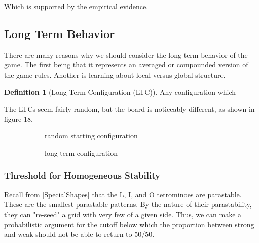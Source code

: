 \documentclass[12pt]{article}
\theoremstyle{definition}
\newtheorem{definition}{Definition}%
\theoremstyle{remark}
\theoremstyle{remark}
\begin{document}
Which is supported by the empirical evidence. %

\subsection{Long Term Behavior}
\label{LongTermB}
\par
There are many reasons why we should consider the long-term behavior of the game. The first being that it represents an averaged or compounded version of the game rules. Another is learning about local versus global structure.

\begin{definition}[Long-Term Configuration (LTC)]
Any configuration which 
\end{definition}


\par
The LTCs seem fairly random, but the board is noticeably different, as shown in figure 18.%

\begin{figure}
  \label{BeforeAfter}
  \centering
  \begin{subfigure}[b]{0.45\linewidth}
    \caption{random starting configuration}
  \end{subfigure}
  \begin{subfigure}[b]{0.45\linewidth}
    \caption{long-term configuration}
  \end{subfigure}
  \caption{}
\end{figure}

\subsubsection{Threshold for Homogeneous Stability} \label{HomoStability}
\par
Recall from \ref{SpecialShapes} that the L, I, and O tetrominoes are parastable. These are the smallest parastable patterns. By the nature of their parastability, they can "re-seed" a grid with very few of a given side. Thus, we can make a probabilistic argument for the cutoff below which the proportion between strong and weak should not be able to return to 50/50.
\end{document}
